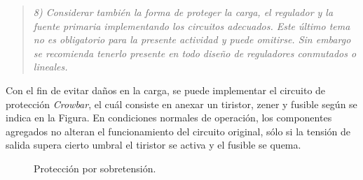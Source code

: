 \begin{quote} \textit{8) Considerar también la forma de proteger la carga, el regulador y la fuente primaria implementando los circuitos adecuados. Este último tema no es obligatorio para la presente actividad y puede omitirse. Sin embargo se recomienda tenerlo presente en todo diseño de reguladores conmutados o lineales.}
\end{quote}

Con el fin de evitar daños en la carga, se puede implementar el circuito de protección \textit{Crowbar}, el cuál consiste en anexar un tiristor, zener y fusible según se indica en la Figura. En condiciones normales de operación, los componentes agregados no alteran el funcionamiento del circuito original, sólo si la tensión de salida supera cierto umbral el tiristor se activa y el fusible se quema.


\begin{figure}[H]
	\centering
	\scalebox{0.5}{}
	\caption{Protección por sobretensión.}
	\label{fig:crowbar}
\end{figure}


